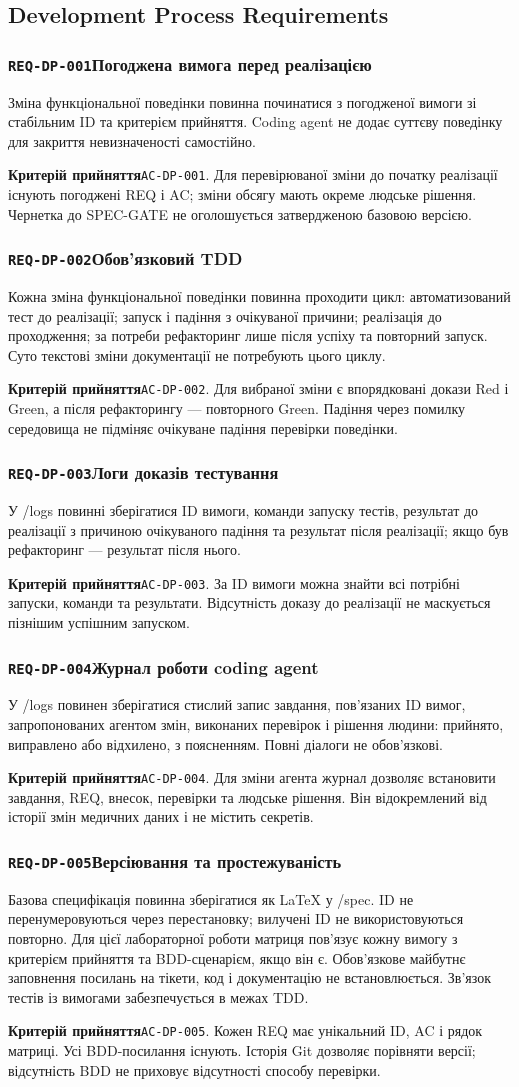 \documentclass[11pt,a4paper]{article}
\newcommand{\requirement}[4]{%
  \Needspace{7\baselineskip}%
  \subsubsection*{\hypertarget{#1}{\texttt{#1}}\quad #2}%
  #3\par
  \textbf{Критерій прийняття}\quad #4\par\medskip}
\begin{document}
\subsection{Development Process Requirements}
\requirement{REQ-DP-001}{Погоджена вимога перед реалізацією}{Зміна функціональної поведінки повинна починатися з погодженої вимоги зі стабільним ID та критерієм прийняття. Coding agent не додає суттєву поведінку для закриття невизначеності самостійно.}{\hypertarget{AC-DP-001}{\texttt{AC-DP-001}}. Для перевірюваної зміни до початку реалізації існують погоджені REQ і AC; зміни обсягу мають окреме людське рішення. Чернетка до SPEC-GATE не оголошується затвердженою базовою версією.}

\requirement{REQ-DP-002}{Обов’язковий TDD}{Кожна зміна функціональної поведінки повинна проходити цикл: автоматизований тест до реалізації; запуск і падіння з очікуваної причини; реалізація до проходження; за потреби рефакторинг лише після успіху та повторний запуск. Суто текстові зміни документації не потребують цього циклу.}{\hypertarget{AC-DP-002}{\texttt{AC-DP-002}}. Для вибраної зміни є впорядковані докази Red і Green, а після рефакторингу — повторного Green. Падіння через помилку середовища не підміняє очікуване падіння перевірки поведінки.}

\requirement{REQ-DP-003}{Логи доказів тестування}{У /logs повинні зберігатися ID вимоги, команди запуску тестів, результат до реалізації з причиною очікуваного падіння та результат після реалізації; якщо був рефакторинг — результат після нього.}{\hypertarget{AC-DP-003}{\texttt{AC-DP-003}}. За ID вимоги можна знайти всі потрібні запуски, команди та результати. Відсутність доказу до реалізації не маскується пізнішим успішним запуском.}

\requirement{REQ-DP-004}{Журнал роботи coding agent}{У /logs повинен зберігатися стислий запис завдання, пов’язаних ID вимог, запропонованих агентом змін, виконаних перевірок і рішення людини: прийнято, виправлено або відхилено, з поясненням. Повні діалоги не обов’язкові.}{\hypertarget{AC-DP-004}{\texttt{AC-DP-004}}. Для зміни агента журнал дозволяє встановити завдання, REQ, внесок, перевірки та людське рішення. Він відокремлений від історії змін медичних даних і не містить секретів.}

\requirement{REQ-DP-005}{Версіювання та простежуваність}{Базова специфікація повинна зберігатися як LaTeX у /spec. ID не перенумеровуються через перестановку; вилучені ID не використовуються повторно. Для цієї лабораторної роботи матриця пов’язує кожну вимогу з критерієм прийняття та BDD-сценарієм, якщо він є. Обов’язкове майбутнє заповнення посилань на тікети, код і документацію не встановлюється. Зв’язок тестів із вимогами забезпечується в межах TDD.}{\hypertarget{AC-DP-005}{\texttt{AC-DP-005}}. Кожен REQ має унікальний ID, AC і рядок матриці. Усі BDD-посилання існують. Історія Git дозволяє порівняти версії; відсутність BDD не приховує відсутності способу перевірки.}
\end{document}
